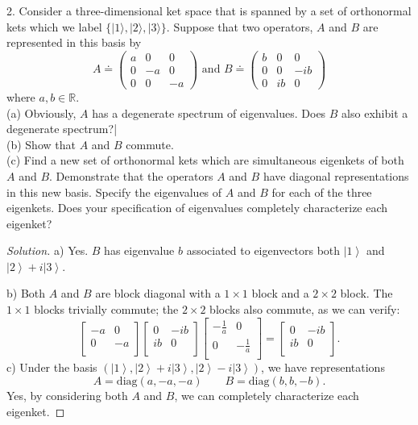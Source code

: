 \begin{problem}
	
2. Consider a three-dimensional ket space that is spanned by a set of orthonormal kets which we label $\{|1\rangle,|2\rangle,|3\rangle\}$. Suppose that two operators, $A$ and $B$ are represented in this basis by
\[
A \doteq\left(\begin{array}{ccc}
a & 0 & 0 \\
0 & -a & 0 \\
0 & 0 & -a
\end{array}\right) \text { and } B \doteq\left(\begin{array}{ccc}
b & 0 & 0 \\
0 & 0 & -i b \\
0 & i b & 0
\end{array}\right)
\]
where $a, b \in \mathbb{R}$.\\
(a) Obviously, $A$ has a degenerate spectrum of eigenvalues. Does $B$ also exhibit a degenerate spectrum?|\\
(b) Show that $A$ and $B$ commute.\\
(c) Find a new set of orthonormal kets which are simultaneous eigenkets of both $A$ and $B$. Demonstrate that the operators $A$ and $B$ have diagonal representations in this new basis. Specify the eigenvalues of $A$ and $B$ for each of the three eigenkets. Does your specification of eigenvalues completely characterize each eigenket?
\end{problem}
\begin{proof}[Solution]
	a) Yes. $B$ has eigenvalue $b$ associated to eigenvectors both $\left| 1 \right\rangle $ and $ \left| 2 \right\rangle + i \left| 3 \right\rangle $.
 
	b) Both $A$ and $B$ are block diagonal with a $1\times 1$ block and a $2\times 2$ block. The $1\times 1$ blocks trivially commute; the $2\times 2$ blocks also commute, as we can verify:
	\[
		\begin{bmatrix}
			-a & 0 \\
			0 & -a \\
		\end{bmatrix}
		\begin{bmatrix}
			0 & -ib  \\
			ib  & 0 \\
		\end{bmatrix}
		\begin{bmatrix}
			-\frac{1}{a} & 0 \\
			0 & -\frac{1}{a} \\
		\end{bmatrix}
		=
		\begin{bmatrix}
			0 & -ib  \\
			ib  & 0 \\
		\end{bmatrix}
	.\] 
	c) 
	Under the basis $\left( \left| 1 \right\rangle , \left| 2 \right\rangle  + i \left| 3 \right\rangle , \left| 2 \right\rangle  - i \left| 3 \right\rangle  \right) $, we have representations
	\[
		A = \text{diag}(a, -a, -a) \qquad 
		B = \text{diag}(b, b, -b)
	.\] 
	Yes, by considering both $A$ and $B$, we can completely characterize each eigenket.
	
\end{proof}

